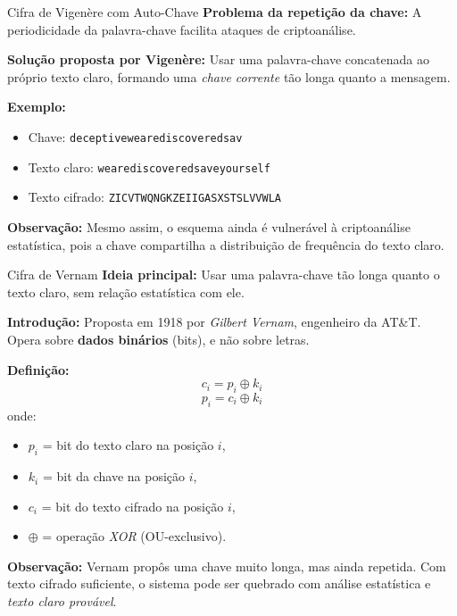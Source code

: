 \begin{frame}{Cifra de Vigenère com Auto-Chave}
    \textbf{Problema da repetição da chave:}
    A periodicidade da palavra-chave facilita ataques de criptoanálise.

    \medskip
    \textbf{Solução proposta por Vigenère:}
    Usar uma palavra-chave concatenada ao próprio texto claro, formando uma \textit{chave corrente} tão longa quanto a mensagem.

    \medskip
    \textbf{Exemplo:}
    \begin{itemize}
        \item Chave: \texttt{deceptivewearediscoveredsav}
        \item Texto claro: \texttt{wearediscoveredsaveyourself}
        \item Texto cifrado: \texttt{ZICVTWQNGKZEIIGASXSTSLVVWLA}
    \end{itemize}

    \medskip
    \textbf{Observação:}
    Mesmo assim, o esquema ainda é vulnerável à criptoanálise estatística, pois a chave compartilha a distribuição de frequência do texto claro.
\end{frame}



\begin{frame}{Cifra de Vernam}
    \textbf{Ideia principal:}
    Usar uma palavra-chave tão longa quanto o texto claro, sem relação estatística com ele.

    \medskip
    \textbf{Introdução:}
    Proposta em 1918 por \textit{Gilbert Vernam}, engenheiro da AT\&T.
    Opera sobre \textbf{dados binários} (bits), e não sobre letras.

    \medskip
    \textbf{Definição:}
    \[
        c_i = p_i \oplus k_i
    \]
    \[
        p_i = c_i \oplus k_i
    \]
    onde:
    \begin{itemize}
        \item $p_i$ = bit do texto claro na posição $i$,
        \item $k_i$ = bit da chave na posição $i$,
        \item $c_i$ = bit do texto cifrado na posição $i$,
        \item $\oplus$ = operação \textit{XOR} (OU-exclusivo).
    \end{itemize}

    \medskip
    \textbf{Observação:}
    Vernam propôs uma chave muito longa, mas ainda repetida.
    Com texto cifrado suficiente, o sistema pode ser quebrado com análise estatística e \textit{texto claro provável}.
\end{frame}

